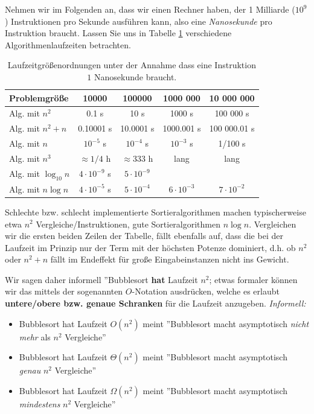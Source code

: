 \documentclass{article}
\begin{document}
Nehmen wir im Folgenden an, dass wir einen Rechner haben, der 1 Milliarde ($10^9$) Instruktionen pro Sekunde ausführen kann, also
eine \emph{Nanosekunde} pro Instruktion braucht.
Lassen Sie uns in Tabelle \ref{tab:running} verschiedene Algorithmenlaufzeiten betrachten.

\begin{table}[h]
\centering
\begin{tabular}{l|c|c|c|c}
Problemgröße 	&	10000	& 100000	& 1000 000	& 10 000 000\\
\hline
Alg. mit $n^2$	& 0.1 s		& 10 s		& 1000 s	& 100 000 s \\
Alg. mit $n^2+n$& 0.10001 s	& 10.0001 s		& 1000.001 s	& 100 000.01 s \\
Alg. mit $n$ 	& $10^{-5}$ s	& $10^{-4}$ s	& $10^{-3}$ s	& 1/100 s \\	
Alg. mit $n^3$ 	& $\approx 1/4$ h& $\approx 333$ h & lang	& lang\\
Alg. mit $\log_{10} n$ & $4\cdot 10^{-9}$ s & $5\cdot10^{-9}$	& \\
Alg. mit $n\log n$ & $4\cdot10^{-5}$ s & $5\cdot 10^{-4}$ & $6\cdot 10^{-3}$ & $7\cdot 10^{-2}$\\
\end{tabular} 
\caption{Laufzeitgrößenordnungen unter der Annahme dass eine Instruktion $1$ Nanosekunde braucht.} \label{tab:running}
\end{table}

Schlechte bzw. schlecht implementierte Sortieralgorithmen machen typischerweise etwa $n^2$ Vergleiche/Instruktionen,
gute Sortieralgorithmen $n\log n$. Vergleichen wir die ersten beiden Zeilen der Tabelle, fällt ebenfalls auf, dass die
bei der Laufzeit im Prinzip nur der Term mit der höchsten Potenze dominiert, d.h. ob $n^2$ oder $n^2+n$ fällt im Endeffekt
für große Eingabeinstanzen nicht ins Gewicht. 

Wir sagen daher informell ''Bubblesort\textbf{ hat }Laufzeit $n^2$; etwas formaler können wir das mittels der sogenannten $O$-Notation ausdrücken,
welche es erlaubt\textbf{ untere/obere bzw. genaue Schranken }für die Laufzeit anzugeben. 
\textit{Informell:}
\begin{itemize}
\item Bubblesort hat Laufzeit $O(n^2)$ meint ''Bubblesort macht asymptotisch \emph{nicht mehr} als $n^2$ Vergleiche''
\item Bubblesort hat Laufzeit $\Theta(n^2)$ meint ''Bubblesort macht asymptotisch \emph{genau} $n^2$ Vergleiche''
\item Bubblesort hat Laufzeit $\Omega(n^2)$ meint ''Bubblesort macht asymptotisch \emph{mindestens} $n^2$ Vergleiche''
\end{itemize}
\end{document}
